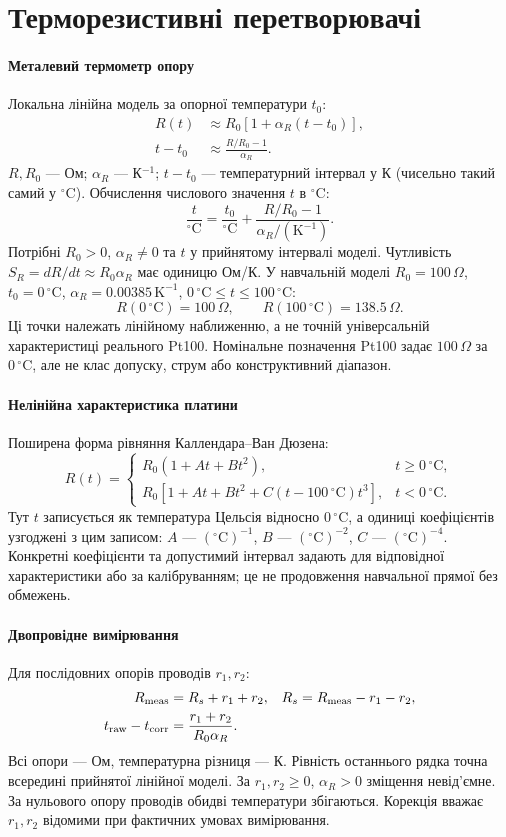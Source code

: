 \documentclass[11pt,a4paper]{article}
\newcommand{\K}{\mathrm{K}}
\newcommand{\C}{\,{}^{\circ}\mathrm{C}}
\newcommand{\Ohm}{\,\Omega}
\newcommand{\unit}[1]{\,\mathrm{#1}}
\newcommand{\defn}[1]{\paragraph{#1}}
\begin{document}
\section{Терморезистивні перетворювачі}

\defn{Металевий термометр опору}
Локальна лінійна модель за опорної температури $t_0$:
\begin{align}
 R(t)&\approx R_0[1+\alpha_R(t-t_0)],\\
 t-t_0&\approx\frac{R/R_0-1}{\alpha_R}.
\end{align}
$R,R_0$ --- Ом; $\alpha_R$ --- К$^{-1}$; $t-t_0$ --- температурний інтервал у К (чисельно такий самий у $^{\circ}$C).
Обчислення числового значення $t$ в $^{\circ}$C:
\[
 \frac{t}{{}^{\circ}\mathrm C}
 =\frac{t_0}{{}^{\circ}\mathrm C}
 +\frac{R/R_0-1}{\alpha_R/(\K^{-1})}.
\]
Потрібні $R_0>0$, $\alpha_R\ne0$ та $t$ у прийнятому інтервалі моделі.
Чутливість $S_R=dR/dt\approx R_0\alpha_R$ має одиницю Ом/К.
У навчальній моделі $R_0=100\Ohm$, $t_0=0\C$,
$\alpha_R=0.00385\unit{K^{-1}}$, $0\C\le t\le100\C$:
\[
 R(0\C)=100\Ohm,\qquad R(100\C)=138.5\Ohm.
\]
Ці точки належать лінійному наближенню, а не точній універсальній характеристиці реального Pt100.
Номінальне позначення Pt100 задає $100\Ohm$ за $0\C$, але не клас допуску, струм або конструктивний діапазон.

\defn{Нелінійна характеристика платини}
Поширена форма рівняння Каллендара--Ван Дюзена:
\[
 R(t)=\begin{cases}
 R_0(1+At+Bt^2),& t\ge0\C,\\
 R_0[1+At+Bt^2+C(t-100\C)t^3],&t<0\C.
 \end{cases}
\]
Тут $t$ записується як температура Цельсія відносно $0\C$,
а одиниці коефіцієнтів узгоджені з цим записом:
$A$ --- $({}^{\circ}\mathrm C)^{-1}$,
$B$ --- $({}^{\circ}\mathrm C)^{-2}$,
$C$ --- $({}^{\circ}\mathrm C)^{-4}$.
Конкретні коефіцієнти та допустимий інтервал задають для відповідної характеристики або за калібруванням; це не продовження навчальної прямої без обмежень.

\defn{Двопровідне вимірювання}
Для послідовних опорів проводів $r_1,r_2$:
\begin{align}
 R_{\rm meas}&=R_s+r_1+r_2, &
 R_s&=R_{\rm meas}-r_1-r_2,\\
 t_{\rm raw}-t_{\rm corr}&=\frac{r_1+r_2}{R_0\alpha_R}.
\end{align}
Всі опори --- Ом, температурна різниця --- К.
Рівність останнього рядка точна всередині прийнятої лінійної моделі.
За $r_1,r_2\ge0$, $\alpha_R>0$ зміщення невід'ємне.
За нульового опору проводів обидві температури збігаються.
Корекція вважає $r_1,r_2$ відомими при фактичних умовах вимірювання.
\end{document}
